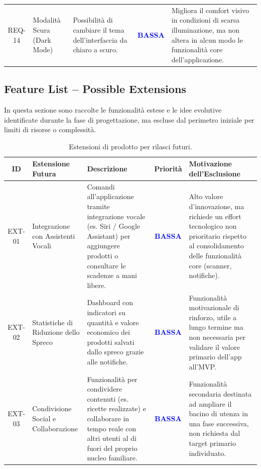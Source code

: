 \documentclass[11pt,a4paper]{article}
\begin{document}
{\begin{longtable}{
  c 
  >{\raggedright\arraybackslash}p{} 
  >{\raggedright\arraybackslash}p{} 
  c 
  >{\raggedright\arraybackslash}p{}
}
REQ-14 & Modalità Scura (Dark Mode) & Possibilità di cambiare il tema dell'interfaccia da chiaro a scuro. & \textcolor{blue}{\textbf{BASSA}} & Migliora il comfort visivo in condizioni di scarsa illuminazione, ma non altera in alcun modo le funzionalità core dell'applicazione. \\
\end{longtable}
}

\subsection{Feature List – Possible Extensions}
In questa sezione sono raccolte le funzionalità estese e le idee evolutive identificate durante la fase di progettazione, ma escluse dal perimetro iniziale per limiti di risorse o complessità.

\begin{table}[htbp]
\centering
\small
\renewcommand{\arraystretch}{1.3}
\begin{tabularx}{\textwidth}{c >{\raggedright\arraybackslash}p{2.8cm} X c >{\raggedright\arraybackslash}X}
\toprule
\textbf{ID} & \textbf{Estensione Futura} & \textbf{Descrizione} & \textbf{Priorità} & \textbf{Motivazione dell'Esclusione} \\ 
\midrule
EXT-01 & Integrazione con Assistenti Vocali & Comandi all'applicazione tramite integrazione vocale (es. Siri / Google Assistant) per aggiungere prodotti o consultare le scadenze a mani libere. & \textcolor{blue}{\textbf{BASSA}} & Alto valore d'innovazione, ma richiede un effort tecnologico non prioritario rispetto al consolidamento delle funzionalità core (scanner, notifiche). \\ \addlinespace[0.5em]
EXT-02 & Statistiche di Riduzione dello Spreco & Dashboard con indicatori su quantità e valore economico dei prodotti salvati dallo spreco grazie alle notifiche. & \textcolor{blue}{\textbf{BASSA}} & Funzionalità motivazionale di rinforzo, utile a lungo termine ma non necessaria per validare il valore primario dell'app all'MVP. \\ \addlinespace[0.5em]
EXT-03 & Condivisione Social e Collaborazione & Funzionalità per condividere contenuti (es. ricette realizzate) e collaborare in tempo reale con altri utenti al di fuori del proprio nucleo familiare. & \textcolor{blue}{\textbf{BASSA}} & Funzionalità secondaria destinata ad ampliare il bacino di utenza in una fase successiva, non richiesta dal target primario individuato. \\ 
\bottomrule
\end{tabularx}
\caption{Estensioni di prodotto per rilasci futuri.}
\end{table}
\end{document}
